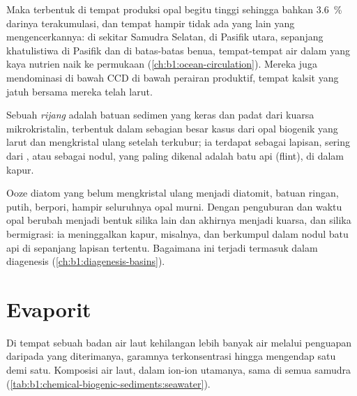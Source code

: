 Maka  terbentuk di tempat produksi opal begitu tinggi sehingga bahkan \qty{3.6}{\%} darinya terakumulasi, dan tempat hampir tidak ada yang lain yang mengencerkannya: di sekitar Samudra Selatan, di Pasifik utara, sepanjang khatulistiwa di Pasifik dan di batas-batas benua, tempat-tempat air dalam yang kaya nutrien naik ke permukaan (\cref{ch:b1:ocean-circulation}). Mereka juga mendominasi di bawah CCD di bawah perairan produktif, tempat kalsit yang jatuh bersama mereka telah larut.

\begin{definition}[Rijang]\label{def:b1:chemical-biogenic-sediments:chert}
Sebuah \emph{rijang} adalah batuan sedimen yang keras dan padat dari kuarsa mikrokristalin, terbentuk dalam sebagian besar kasus dari opal biogenik yang larut dan mengkristal ulang setelah terkubur; ia terdapat sebagai lapisan, sering dari , atau sebagai nodul, yang paling dikenal adalah batu api (flint), di dalam kapur.
\end{definition}

Ooze diatom yang belum mengkristal ulang menjadi diatomit, batuan ringan, putih, berpori, hampir seluruhnya opal murni. Dengan penguburan dan waktu opal berubah menjadi bentuk silika lain dan akhirnya menjadi kuarsa, dan silika bermigrasi: ia meninggalkan kapur, misalnya, dan berkumpul dalam nodul batu api di sepanjang lapisan tertentu. Bagaimana ini terjadi termasuk dalam diagenesis (\cref{ch:b1:diagenesis-basins}).

\section{Evaporit}\label{sec:b1:chemical-biogenic-sediments:evaporites}

Di tempat sebuah badan air laut kehilangan lebih banyak air melalui penguapan daripada yang diterimanya, garamnya terkonsentrasi hingga mengendap satu demi satu. Komposisi air laut, dalam ion-ion utamanya, sama di semua samudra (\cref{tab:b1:chemical-biogenic-sediments:seawater}).


